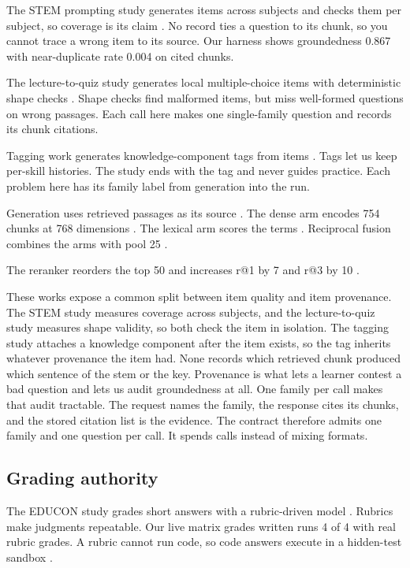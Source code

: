 \documentclass[sn-mathphys,Numbered]{sn-jnl}%
\theoremstyle{thmstyleone}%
\theoremstyle{thmstyletwo}%
\theoremstyle{thmstylethree}%
\begin{document}
The STEM prompting study generates items across subjects and checks them per subject, so coverage is its claim \cite{itemgen2024}. No record ties a question to its chunk, so you cannot trace a wrong item to its source. Our harness shows groundedness 0.867 with near-duplicate rate 0.004 on cited chunks.

The lecture-to-quiz study generates local multiple-choice items with deterministic shape checks \cite{lecturequiz2026}. Shape checks find malformed items, but miss well-formed questions on wrong passages. Each call here makes one single-family question and records its chunk citations.

Tagging work generates knowledge-component tags from items \cite{kctag2024}. Tags let us keep per-skill histories. The study ends with the tag and never guides practice. Each problem here has its family label from generation into the run.

Generation uses retrieved passages as its source \cite{lewis2020}. The dense arm encodes 754 chunks at 768 dimensions \cite{karpukhin2020}. The lexical arm scores the terms \cite{robertson2009}. Reciprocal fusion combines the arms with pool 25 \cite{cormack2009}.

The reranker reorders the top 50 and increases r@1 by 7 and r@3 by 10 \cite{qwen3rerank}.

These works expose a common split between item quality and item provenance. The STEM study measures coverage across subjects, and the lecture-to-quiz study measures shape validity, so both check the item in isolation. The tagging study attaches a knowledge component after the item exists, so the tag inherits whatever provenance the item had. None records which retrieved chunk produced which sentence of the stem or the key. Provenance is what lets a learner contest a bad question and lets us audit groundedness at all. One family per call makes that audit tractable. The request names the family, the response cites its chunks, and the stored citation list is the evidence. The contract therefore admits one family and one question per call. It spends calls instead of mixing formats.

\subsection{Grading authority}\label{subsec23}

The EDUCON study grades short answers with a rubric-driven model \cite{llmgrade2024}. Rubrics make judgments repeatable. Our live matrix grades written runs 4 of 4 with real rubric grades. A rubric cannot run code, so code answers execute in a hidden-test sandbox \cite{piston}.
\end{document}

